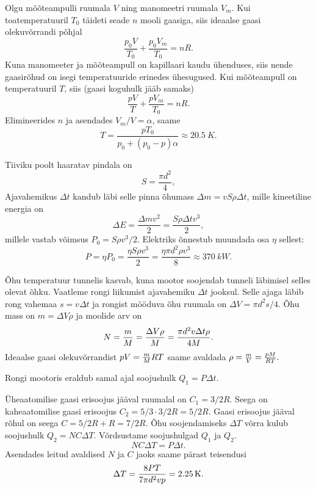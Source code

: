 \documentclass[10pt, twoside]{article}
\begin{document}
{%

\solu
Olgu mõõteampulli ruumala $V$ ning manomeetri ruumala $V_m$. Kui toatemperatuuril $T_0$ täideti seade $n$ mooli gaasiga, siis ideaalse gaasi olekuvõrrandi põhjal
\[
\frac{p_0V}{T_0} + \frac{p_0V_m}{T_0} = nR.
\]
Kuna manomeeter ja mõõteampull on kapillaari kaudu ühenduses, siis nende gaasirõhud on isegi temperatuuride erinedes ühesugused. Kui mõõteampull on temperatuuril $T$, siis (gaasi koguhulk jääb samaks)
\[
\frac{pV}{T} + \frac{pV_m}{T_0} = nR.
\]
Elimineerides $n$ ja asendades $V_m/V = \alpha$, saame
\[
T=\frac{p T_{0}}{p_{0}+\left(p_{0}-p\right) \alpha} \approx \SI{20,5}{K}.
\]
\probend
\bigskip


\solu
Tiiviku poolt haaratav pindala on
\[
S = \frac{\pi d^2}{4},
\]
Ajavahemikus $\Delta t$ kandub läbi selle pinna õhumass $\Delta m = vS\rho \Delta t$, mille kineetiline energia on
\[
\Delta E=\frac{\Delta m v^{2}}{2}=\frac{S \rho \Delta t v^{3}}{2},
\]
millele vastab võimsus $P_0 = S\rho v^3/2$. Elektriks õnnestub muundada
osa $\eta$ sellest:
\[
P=\eta P_{0}=\frac{\eta S \rho v^{3}}{2}=\frac{\eta \pi d^2 \rho v^{3}}{8} \approx \SI{370}{kW}.
\]
\probend
\bigskip


\solu
Õhu temperatuur tunnelis kasvab, kuna mootor soojendab tunneli läbimisel selles olevat õhku. Vaatleme rongi liikumist ajavahemiku $\Delta t$ jooksul. Selle ajaga läbib rong vahemaa $s = v \Delta t$ ja rongist mööduva õhu ruumala on $\Delta V = \pi d^2 s /4$. Õhu mass on $m = \Delta V \rho$ ja moolide arv on
\[
N = {m \over M}={\Delta V \rho \over M}={\pi d^2 v \Delta t\rho\over 4M}.
\]
Ideaalse gaasi olekuvõrrandist $pV={m\over M}RT$ saame avaldada $\rho={m\over V}={pM\over RT}.$

Rongi mootoris eraldub samal ajal soojushulk $Q_1 = P \Delta t$.

Üheaatomilise gaasi erisoojus jääval ruumalal on $C_1 = 3/2 R$. Seega on kaheaatomilise gaasi erisoojus $C_2 = 5/3 \cdot 3/2R = 5/2 R$. Gaasi erisoojus jääval rõhul on seega $C = 5/2R + R = 7/2 R$. Õhu soojendamiseks $\Delta T$ võrra kulub soojushulk $Q_2 = N C \Delta T$. Võrdsustame soojushulgad $Q_1$ ja $Q_2$.
\[
N C \Delta T = P \Delta t.
\]
Asendades leitud avaldised $N$ ja $C$ jaoks saame pärast teisendusi
\[
\Delta T = {8 P T \over 7\pi d^2 v p } = \SI{2.25}{K}.
\]
\probend
\bigskip

}
\end{document}
